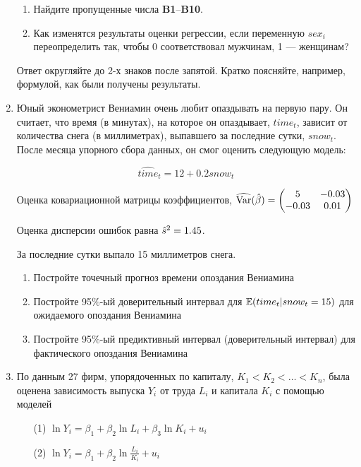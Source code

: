 \documentclass[12pt, a4paper]{article}
\theoremstyle{definition}
\begin{document}
\begin{enumerate}
\begin{enumerate}
\item Найдите пропущенные числа \textbf{B1}--\textbf{B10}.

\item Как изменятся результаты оценки регрессии, если переменную $sex_i$ переопределить так, чтобы 0 соответствовал мужчинам, 1 — женщинам?
\end{enumerate}

Ответ округляйте до 2-х знаков после запятой. Кратко поясняйте, например, формулой, как были получены результаты.



\item Юный эконометрист Вениамин очень любит опаздывать на первую пару. Он считает, что время (в минутах), на которое он опаздывает, $time_t$, зависит от количества снега (в миллиметрах), выпавшего за последние сутки, $snow_t$. После месяца упорного сбора данных, он смог оценить следующую модель:

\[
\widehat{time}_t=12+0.2snow_t
\]

Оценка ковариационной матрицы коэффициентов,
$\operatorname{\widehat{\operatorname{Var}}}(\hat{\beta}) = \begin{pmatrix}
5 & -0.03 \\
-0.03 & 0.01\\
\end{pmatrix}$

Оценка дисперсии ошибок равна $\hat{s}^2=1.45$.

За последние сутки выпало 15 миллиметров снега.

\begin{enumerate}
\item Постройте точечный прогноз времени опоздания Вениамина
\item Постройте 95\%-ый доверительный интервал для $\operatorname{\mathbb{E}}(time_t |snow_t=15)$ для ожидаемого опоздания Вениамина
\item	Постройте 95\%-ый предиктивный интервал (доверительный интервал) для фактического опоздания Вениамина
\end{enumerate}


\item По данным 27 фирм, упорядоченных по капиталу, $K_1 < K_2 < \ldots < K_n$, была оценена зависимость выпуска $Y_i$ от труда $L_i$ и капитала $K_i$ с помощью моделей

\begin{enumerate}
\item[(1)] $\ln Y_i = \beta_1 + \beta_2 \ln L_i + \beta_3 \ln K_i + u_i$
\item[(2)] $\ln Y_i = \beta_1 + \beta_2 \ln \frac{L_i}{K_i} + u_i$
\end{enumerate}



\end{enumerate}
\end{document}
